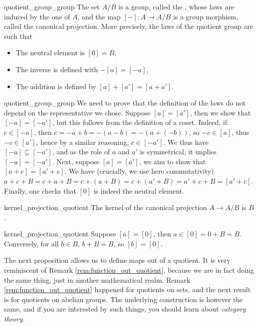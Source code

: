 \begin{clem}{}{quotient_group_group}
    The set \( A / B \) is a group, called the , whose laws are induced by the one of \( A \), and the map \( [-] : A \to A / B \) is a group morphism, called the canonical projection. More precisely, the laws of the quotient group are such that
    \begin{itemize}
        \item The neutral element is \( [0] = B \),
        \item The inverse is defined with \( - [a] = [- a] \), 
        \item The addition is defined by \( [a] + [a'] = [a + a'] \).
    \end{itemize}
\end{clem}
\begin{lemproof}{quotient_group_group}
     We need to prove that the definition of the laws do not depend on the representative we chose. Suppose \( [a] = [a'] \), then we show that \( [-a] = [- a'] \), but this follows from the definition of a coset. Indeed, if \( c \in [- a] \), then \( c = - a + b = - (a - b) = - (a + (- b)) \), so \( -c \in [a] \), thus \( -c \in [a'] \), hence by a similar reasoning, \( c \in [- a'] \). We thus have \( [-a] \subseteq [- a'] \), and as the role of \( a \) and \( a' \) is symmetrical, it implies \( [-a] = [- a'] \). Next, suppose \( [a] = [a'] \), we aim to show that \( [a + c] = [a' + c] \). We have (crucially, we use here commutativity) \( a + c + B = c + a + B = c + (a + B) = c + (a' + B) = a' + c + B = [a' + c] \). Finally, one checks that \( [0] \) is indeed the neutral element. 
\end{lemproof}

\begin{clem}{}{kernel_projection_quotient}
    The kernel of the canonical projection \( A \to A / B \) is \( B \).    
\end{clem}
\begin{lemproof}{kernel_projection_quotient}
    Suppose \( [a] = [0] \), then \( a \in [0] = 0 + B = B \). Conversely, for all \( b \in B \), \( b + B = B \), so \( [b] = [0] \).
\end{lemproof}

The next proposition allows us to define maps out of a quotient. It is very reminiscent of Remark \ref{rem:function_out_quotient}, because we are in fact doing the same thing, just in another mathematical realm. Remark \ref{rem:function_out_quotient} happened for quotients on sets, and the next result is for quotients on abelian groups. The underlying construction is however the same, and if you are interested by such things, you should learn about \textit{category theory}.

